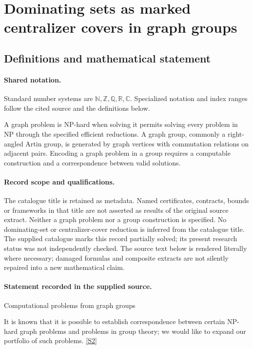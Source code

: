 \documentclass[11pt]{article}
\newcommand{\sref}[2]{\hyperlink{source:#1:#2}{[S#2]}}
\begin{document}
\section{Dominating sets as marked centralizer covers in graph groups}\label{statement}

\subsection{Definitions and mathematical statement}

\paragraph{Shared notation.}Standard number systems are $\mathbb N,\mathbb Z,\mathbb Q,\mathbb R,\mathbb C$. Specialized notation and index ranges follow the cited source and the definitions below.


A graph problem is NP-hard when solving it permits solving every problem in NP through the specified efficient reductions. A graph group, commonly a right-angled Artin group, is generated by graph vertices with commutation relations on adjacent pairs. Encoding a graph problem in a group requires a computable construction and a correspondence between valid solutions.
\paragraph{Record scope and qualifications.}
The catalogue title is retained as metadata. Named certificates, contracts, bounds or frameworks in that title are not asserted as results of the original source extract.
Neither a graph problem nor a group construction is specified. No dominating-set or centralizer-cover reduction is inferred from the catalogue title. The supplied catalogue marks this record partially solved; its present research status was not independently checked.
The source text below is rendered literally where necessary; damaged formulas and composite extracts are not silently repaired into a new mathematical claim.
\paragraph{Statement recorded in the supplied source.}
Computational problems from graph groups

It is known that it is possible to establish correspondence between certain NP-hard graph problems and problems in group theory; we would like to expand our portfolio of such problems. \sref{statement}{2}
\end{document}
